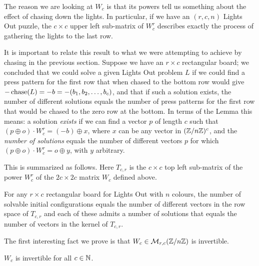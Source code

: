 
The reason we are looking at $W_{c}$ is that its powers tell us something about
the effect of chasing down the lights. In particular, if we have an $(r, c, n)$
Lights Out puzzle, the $c \times c$ upper left sub-matrix of
$W_{c}^{r}$ describes exactly the process of gathering the lights
to the last row.

It is important to relate this result to what we were attempting
to achieve by chasing in the previous section. Suppose we have an
$r\times c$ rectangular board; we concluded that we could solve
a given Lights Out problem $L$ if we could find a press pattern for
the first row that when chased to the bottom row would give
$-\operatorname{chase}(L)=-b=-(b_1, b_2, \ldots, b_c)$, and that if such a solution
exists, the number of different solutions equals the number of
press patterns for the first row that would be chased to the zero
row at the bottom. In terms of the Lemma this means: a solution {\it exists}
if we can find a vector $p$ of length $c$ such that $(p\oplus o)\cdot W_c^r=
(-b)\oplus x$, where $x$ can be any vector in $(\mathbb{Z}/n\mathbb{Z})^c$, and the
{\it number of solutions} equals the number of different vectors $p$
for which $(p\oplus o)\cdot W_c^r=o\oplus y$, with $y$ arbitrary.

This is summarized as follows. Here
$T_{c, r}$ is the $c\times c$ top left
sub-matrix of the power $W_c^r$ of
the $2c\times 2c$ matrix $W_c$ 
defined above.
\begin{corollary}\label{cor:numbers}
For any $r\times c$ rectangular board for Lights Out with
$n$ colours, the number of solvable initial configurations
equals the number of different vectors in the row space
of $T_{c, r}$ and each of these admits a number of solutions
that equals the number of vectors in the kernel of $T_{c, r}$.
\end{corollary}
%
The first interesting fact we prove is that $W_{c}\in\mathcal{M}_{r,c}(\mathbb{Z}/n\mathbb{Z})$
is invertible.

\begin{lemma}\label{lem:Winv}
  $W_{c}$ is invertible for all $c\in\mathbb{N}$.
\end{lemma}

